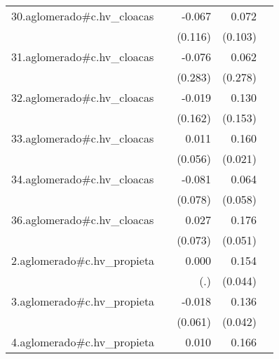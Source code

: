 {\begin{longtable}{l*{4}{D{.}{.}{-1}}}
\addlinespace
30.aglomerado#c.hv\_cloacas&                     &      -0.067         &       0.072         &                     \\
            &                     &     (0.116)         &     (0.103)         &                     \\
\addlinespace
31.aglomerado#c.hv\_cloacas&                     &      -0.076         &       0.062         &                     \\
            &                     &     (0.283)         &     (0.278)         &                     \\
\addlinespace
32.aglomerado#c.hv\_cloacas&                     &      -0.019         &       0.130         &                     \\
            &                     &     (0.162)         &     (0.153)         &                     \\
\addlinespace
33.aglomerado#c.hv\_cloacas&                     &       0.011         &       0.160\sym{***}&                     \\
            &                     &     (0.056)         &     (0.021)         &                     \\
\addlinespace
34.aglomerado#c.hv\_cloacas&                     &      -0.081         &       0.064         &                     \\
            &                     &     (0.078)         &     (0.058)         &                     \\
\addlinespace
36.aglomerado#c.hv\_cloacas&                     &       0.027         &       0.176\sym{***}&                     \\
            &                     &     (0.073)         &     (0.051)         &                     \\
\addlinespace
2.aglomerado#c.hv\_propieta&                     &       0.000         &       0.154\sym{***}&                     \\
            &                     &         (.)         &     (0.044)         &                     \\
\addlinespace
3.aglomerado#c.hv\_propieta&                     &      -0.018         &       0.136\sym{**} &                     \\
            &                     &     (0.061)         &     (0.042)         &                     \\
\addlinespace
4.aglomerado#c.hv\_propieta&                     &       0.010         &       0.166\sym{***}&                     \\

\end{longtable}}
